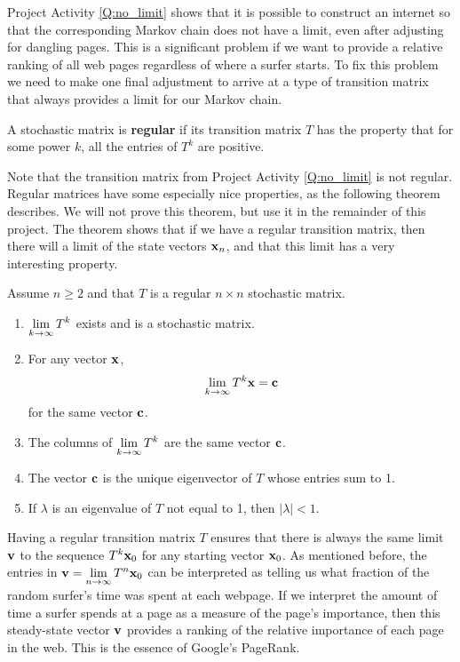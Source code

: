 Project Activity \ref{Q:no_limit} shows that it is possible to construct an internet so that the corresponding Markov chain does not have a limit, even after adjusting for dangling pages. This is a significant problem if we want to provide a relative ranking of all web pages regardless of where a surfer starts. To fix this problem we need to make one final adjustment to arrive at a type of transition matrix that always provides a limit for our Markov chain.

\begin{definition} A stochastic matrix is \textbf{regular} if its transition matrix $T$ has the property that for some power $k$, all the entries of $T^k$ are positive.
\end{definition}

Note that the transition matrix from Project Activity \ref{Q:no_limit} is not regular. Regular matrices have some especially nice properties, as the following theorem describes. We will not prove this theorem, but use it in the remainder of this project. The theorem shows that if we have a regular transition matrix, then there will a limit of the state vectors $\mathbf{x}_n$, and that this limit has a very interesting property.

\begin{theorem} \label{thm:Google_1} Assume $n \geq 2$ and that $T$ is a regular $n \times n$ stochastic matrix.
\begin{enumerate}
\item $\displaystyle \lim_{k \to \infty} T^k$ exists and is a stochastic matrix.
\item For any vector $\mathbf{x}$,
\[\lim_{k \to \infty} T^k \mathbf{x} = \mathbf{c}\]
for the same vector $\mathbf{c}$. 
\item The columns of $\displaystyle \lim_{k \to \infty} T^k$ are the same vector $\mathbf{c}$.
\item The vector $\mathbf{c}$ is the unique eigenvector of $T$ whose entries sum to 1.
\item If $\lambda$ is an eigenvalue of $T$ not equal to 1, then $|\lambda| < 1$.
\end{enumerate}
\end{theorem}

 
Having a regular transition matrix $T$ ensures that there is always the same limit $\mathbf{v}$ to the sequence $T^k \mathbf{x}_0$ for any starting vector $\mathbf{x}_0$. As mentioned before, the entries in $\mathbf{v} = \displaystyle \lim_{n \to \infty} T^n \mathbf{x}_0$ can be interpreted as telling us what fraction of the random surfer's time was spent at each webpage. If we interpret the amount of time a surfer spends at a page as a measure of the page's importance, then this steady-state vector $\mathbf{v}$ provides a ranking of the relative importance of each page in the web. This is the essence of Google's PageRank.

